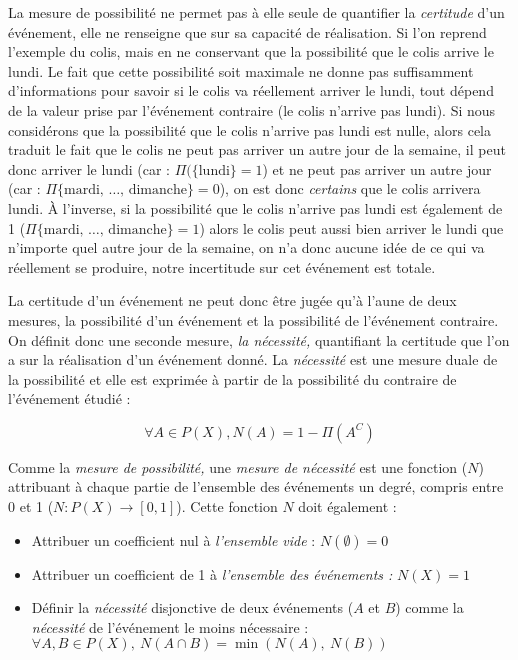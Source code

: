 {La mesure de possibilité ne permet pas à elle seule de quantifier la
\emph{certitude} d'un événement, elle ne renseigne que sur sa capacité
de réalisation. Si l'on reprend l’exemple du colis, mais en ne
conservant que la possibilité que le colis arrive le lundi. Le fait
que cette possibilité soit maximale ne donne pas suffisamment
d'informations pour savoir si le colis va réellement arriver le lundi,
tout dépend de la valeur prise par l'événement contraire (\ie le colis
n'arrive pas lundi). Si nous considérons que la possibilité que le
colis n'arrive pas lundi est nulle, alors cela traduit le fait que le
colis ne peut pas arriver un autre jour de la semaine, il peut donc
arriver le lundi (car : \(\Pi(\{\text{lundi}\}=1\)) et ne peut pas
arriver un autre jour (car : \(\Pi\{\text{mardi, …, dimanche}\}=0\)),
on est donc \emph{certains} que le colis arrivera lundi. À l'inverse,
si la possibilité que le colis n'arrive pas lundi est également de 1
(\ie \(\Pi\{\text{mardi, …, dimanche}\}=1\)) alors le colis peut aussi
bien arriver le lundi que n'importe quel autre jour de la semaine, on
n'a donc aucune idée de ce qui va réellement se produire, notre
incertitude sur cet événement est totale.

La certitude d'un événement ne peut donc être jugée qu'à l'aune de
deux mesures, la possibilité d'un événement et la possibilité de
l'événement contraire. On définit donc une seconde mesure, \emph{la
  nécessité,} quantifiant la certitude que l'on a sur la réalisation
d'un événement donné. La \emph{nécessité} est une mesure duale de la
possibilité et elle est exprimée à partir de la possibilité du
contraire de l'événement étudié :

\begin{equation}
  \label{eq:nec_comp}
  \forall A \in P(X), N(A) = 1 - \Pi(A^C)
\end{equation}

Comme la \emph{mesure de possibilité,} une \emph{mesure de nécessité}
est une fonction (\(N\)) attribuant à chaque partie de l'ensemble des
événements un degré, compris entre 0 et 1
(\(N : P(X) \rightarrow [0,1]\)). Cette fonction \(N\) doit également
:

\begin{itemize}
\item Attribuer un coefficient nul à \emph{l'ensemble vide} :
  \(N(∅)=0\)
\item Attribuer un coefficient de 1 à \emph{l'ensemble des événements
    :} \(N(X)=1\)
\item Définir la \emph{nécessité} disjonctive de deux événements
  (\(A\) et \(B\)) comme la \emph{nécessité} de l'événement le moins
  nécessaire : \(∀ A,B ∈ P(X),\ N(A \cap B) = \min(N(A),\ N(B))\)
\end{itemize}

}
